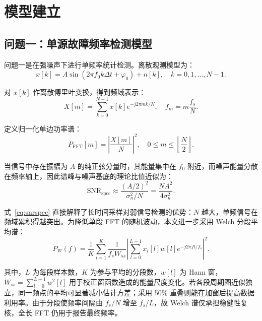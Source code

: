 \documentclass[withoutpreface,bwprint]{cumcmthesis}
\begin{document}
\section{模型建立}

\subsection{问题一：单源故障频率检测模型}

问题一是在强噪声下进行单频率统计检测。离散观测模型为：
\begin{equation}
    x[k]=A\sin(2\pi f_0 k\Delta t+\varphi_0)+n[k],
    \quad k=0,1,\ldots,N-1 .
    \label{eq:obs}
\end{equation}

对 \(x[k]\) 作离散傅里叶变换，得到频域表示：
\begin{equation}
    X[m]=\sum_{k=0}^{N-1}x[k]e^{-j2\pi mk/N},
    \quad f_m=m\frac{f_s}{N}.
    \label{eq:dft}
\end{equation}

定义归一化单边功率谱：
\begin{equation}
    P_{\mathrm{FFT}}[m]=\left|\frac{X[m]}{N}\right|^2,
    \quad 0\leq m\leq \left\lfloor\frac{N}{2}\right\rfloor .
    \label{eq:psd}
\end{equation}

当信号中存在振幅为 \(A\) 的纯正弦分量时，其能量集中在 \(f_0\) 附近，而噪声能量分散在频率轴上，因此谱峰与噪声基底的理论比值近似为：
\begin{equation}
    \mathrm{SNR}_{\mathrm{spec}}
    \approx
    \frac{(A/2)^2}{\sigma_n^2/N}
    =
    \frac{NA^2}{4\sigma_n^2}.
    \label{eq:snrspec}
\end{equation}

式~\eqref{eq:snrspec} 直接解释了长时间采样对弱信号检测的优势：\(N\) 越大，单频信号在频域累积得越突出。为降低单段 FFT 的随机波动，本文进一步采用 Welch 分段平均谱\cite{welch1967}：
\begin{equation}
    P_W(f)=
    \frac{1}{K}
    \sum_{i=1}^{K}
    \frac{1}{f_s W_{ss}}
    \left|
    \sum_{l=0}^{L-1}x_i[l]w[l]e^{-j2\pi fl/f_s}
    \right|^2 .
    \label{eq:welch}
\end{equation}

其中，\(L\) 为每段样本数，\(K\) 为参与平均的分段数，\(w[l]\) 为 Hann 窗，\(W_{ss}=\sum_{l=0}^{L-1}w^2[l]\) 用于校正窗函数造成的能量尺度变化。若各段周期图近似独立，同一频点的平均可显著减小估计方差；采用 50\% 重叠则能在加窗后提高数据利用率。由于分段使频率间隔由 \(f_s/N\) 增至 \(f_s/L\)，故 Welch 谱仅承担稳健性复核，全长 FFT 仍用于报告最终频率。
\end{document}
